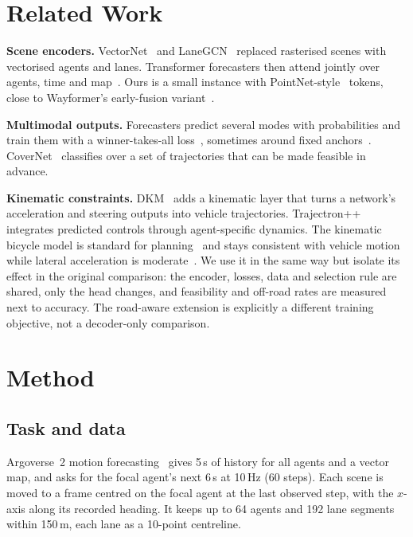 \documentclass[conference]{IEEEtran}
\begin{document}
\section{Related Work}

\textbf{Scene encoders.} VectorNet~\cite{gao2020vectornet} and LaneGCN~\cite{liang2020lanegcn}
replaced rasterised scenes with vectorised agents and lanes. Transformer forecasters then attend
jointly over agents, time and map~\cite{ngiam2022scenetransformer,nayakanti2023wayformer,shi2022mtr,zhou2023qcnet}.
Ours is a small instance with PointNet-style~\cite{qi2017pointnet} tokens, close to Wayformer's
early-fusion variant~\cite{nayakanti2023wayformer}.

\textbf{Multimodal outputs.} Forecasters predict several modes with probabilities and train them
with a winner-takes-all loss~\cite{guzmanrivera2012mcl}, sometimes around fixed
anchors~\cite{chai2019multipath}. CoverNet~\cite{phanminh2020covernet} classifies over a set of
trajectories that can be made feasible in advance.

\textbf{Kinematic constraints.} DKM~\cite{cui2020dkm} adds a kinematic layer that turns a network's
acceleration and steering outputs into vehicle trajectories. Trajectron++~\cite{salzmann2020trajectronpp}
integrates predicted controls through agent-specific dynamics. The kinematic bicycle model is
standard for planning~\cite{kong2015kinematic} and stays consistent with vehicle motion while
lateral acceleration is moderate~\cite{polack2017kinematic}. We use it in the same way but isolate
its effect in the original comparison: the encoder, losses, data and selection rule are shared,
only the head changes, and feasibility and off-road rates are measured next to accuracy. The
road-aware extension is explicitly a different training objective, not a decoder-only comparison.

\section{Method}

\subsection{Task and data}
Argoverse~2 motion forecasting~\cite{wilson2021argoverse2} gives 5\,s of history for all agents and
a vector map, and asks for the focal agent's next 6\,s at 10\,Hz (60 steps). Each scene is moved to
a frame centred on the focal agent at the last observed step, with the $x$-axis along its recorded
heading. It keeps up to 64 agents and 192 lane segments within 150\,m, each lane as a 10-point
centreline.
\end{document}

